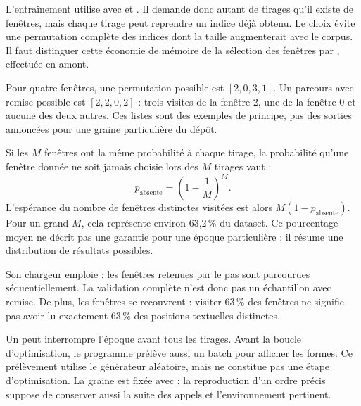 
L'entraînement utilise  avec
 et .
Il demande donc autant de tirages qu'il existe de fenêtres, mais chaque
tirage peut reprendre un indice déjà obtenu. Le choix évite une permutation
complète des indices dont la taille augmenterait avec le corpus.
Il faut distinguer cette économie de mémoire de la sélection des fenêtres
par , effectuée en amont.

Pour quatre fenêtres, une permutation possible est \([2,0,3,1]\).
Un parcours avec remise possible est \([2,2,0,2]\) :
trois visites de la fenêtre 2, une de la fenêtre 0 et aucune des deux autres.
Ces listes sont des exemples de principe, pas des sorties annoncées
pour une graine particulière du dépôt.

Si les \(M\) fenêtres ont la même probabilité à chaque tirage,
la probabilité qu'une fenêtre donnée ne soit jamais choisie lors
des \(M\) tirages vaut :
\[
    p_{\mathrm{absente}}=\left(1-\frac1M\right)^M.
\]
L'espérance du nombre de fenêtres distinctes visitées est alors
\(M(1-p_{\mathrm{absente}})\). Pour un grand \(M\), cela représente
environ 63,2\,\% du dataset. Ce pourcentage moyen ne décrit pas une
garantie pour une époque particulière ; il résume une distribution
de résultats possibles.

Son chargeur emploie  : les fenêtres retenues par
le pas sont parcourues séquentiellement. La validation complète n'est
donc pas un échantillon avec remise. De plus, les fenêtres se recouvrent :
visiter 63\,\% des fenêtres ne signifie pas avoir lu exactement 63\,\%
des positions textuelles distinctes.

Un  peut interrompre l'époque avant tous les tirages.
Avant la boucle d'optimisation, le programme prélève aussi un batch
pour afficher les formes. Ce prélèvement utilise le générateur aléatoire,
mais ne constitue pas une étape d'optimisation. La graine est fixée
avec  ; la reproduction d'un ordre précis suppose
de conserver aussi la suite des appels et l'environnement pertinent.

